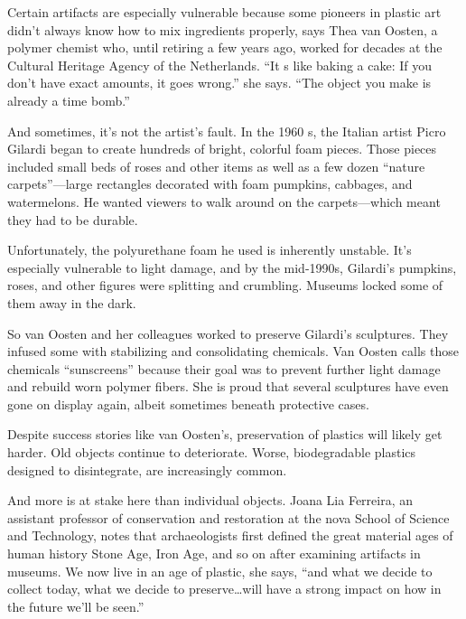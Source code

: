 Certain artifacts are especially vulnerable because some pioneers in
plastic art didn't always know how to
mix ingredients properly, says Thea van Oosten, a polymer chemist who,
until retiring a few years ago, worked for
decades at the Cultural Heritage Agency of the Netherlands. ``It s like
baking a cake: If you don't have exact
amounts, it goes wrong.'' she says. ``The object you make is already a
time bomb.''



And sometimes, it's not the artist's fault. In the 1960 s, the Italian
artist Picro Gilardi began to create hundreds
of bright, colorful foam pieces. Those pieces included small beds of
roses and other items as well as a few dozen
``nature carpets''---large rectangles decorated with foam pumpkins,
cabbages, and watermelons. He wanted
viewers to walk around on the carpets---which meant they had to be
durable.



Unfortunately, the polyurethane foam he used is inherently unstable.
It's especially vulnerable to light
damage, and by the mid-1990s, Gilardi's pumpkins, roses, and other
figures were splitting and crumbling.
Museums locked some of them away in the dark.




So van Oosten and her colleagues worked to preserve Gilardi's
sculptures. They infused some with stabilizing
and consolidating chemicals. Van Oosten calls those chemicals
``sunscreens'' because their goal was to prevent
further light damage and rebuild worn polymer fibers. She is proud that
several sculptures have even gone on
display again, albeit sometimes beneath protective cases.




Despite success stories like van Oosten's, preservation of plastics will
likely get harder. Old objects continue
to deteriorate. Worse, biodegradable plastics designed to disintegrate,
are increasingly common.



And more is at stake here than individual objects. Joana Lia Ferreira, an
assistant professor of conservation
and restoration at the nova School of Science and Technology, notes that
archaeologists first defined the great
material ages of human history Stone Age, Iron Age, and so on after
examining artifacts in museums. We now live
in an age of plastic, she says, ``and what we decide to collect
today, what we decide to preserve\ldots will have a
strong impact on how in the future we'll be seen.''


